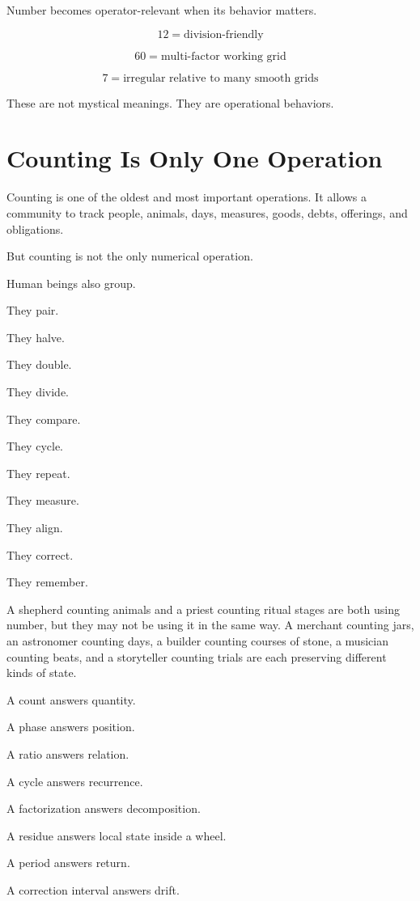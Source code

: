 \documentclass[11pt]{book}
\begin{document}
Number becomes operator-relevant when its behavior matters.

\[
12 = \text{division-friendly}
\]

\[
60 = \text{multi-factor working grid}
\]

\[
7 = \text{irregular relative to many smooth grids}
\]

These are not mystical meanings. They are operational behaviors.

\section{Counting Is Only One Operation}

Counting is one of the oldest and most important operations. It allows a community to track people, animals, days, measures, goods, debts, offerings, and obligations.

But counting is not the only numerical operation.

Human beings also group.

They pair.

They halve.

They double.

They divide.

They compare.

They cycle.

They repeat.

They measure.

They align.

They correct.

They remember.

A shepherd counting animals and a priest counting ritual stages are both using number, but they may not be using it in the same way. A merchant counting jars, an astronomer counting days, a builder counting courses of stone, a musician counting beats, and a storyteller counting trials are each preserving different kinds of state.

A count answers quantity.

A phase answers position.

A ratio answers relation.

A cycle answers recurrence.

A factorization answers decomposition.

A residue answers local state inside a wheel.

A period answers return.

A correction interval answers drift.
\end{document}
